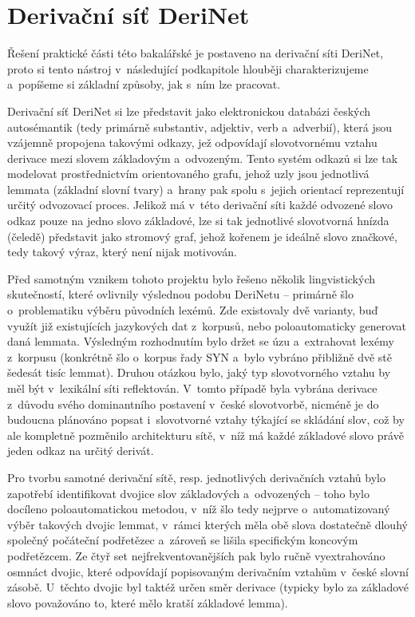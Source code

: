 \hypertarget{derivaux10dnuxed-suxedux165-derinet}{%
\section{Derivační síť
DeriNet}\label{derivaux10dnuxed-suxedux165-derinet}}

Řešení praktické části této bakalářské je postaveno na derivační síti
DeriNet, proto si tento nástroj v~následující podkapitole hlouběji
charakterizujeme a~popíšeme si základní způsoby, jak s~ním lze pracovat.

Derivační síť DeriNet si lze představit jako elektronickou databázi
českých autosémantik (tedy primárně substantiv, adjektiv, verb
a~adverbií), která jsou vzájemně propojena takovými odkazy, jež odpovídají
slovotvornému vztahu derivace mezi slovem základovým a~odvozeným. Tento
systém odkazů si lze tak modelovat prostřednictvím orientovaného grafu,
jehož uzly jsou jednotlivá lemmata (základní slovní tvary) a~hrany pak
spolu s~jejich orientací reprezentují určitý odvozovací proces. Jelikož
má v~této derivační síti každé odvozené slovo odkaz pouze na jedno slovo
základové, lze si tak jednotlivé slovotvorná hnízda (čeledě) představit
jako stromový graf, jehož kořenem je ideálně slovo značkové, tedy takový
výraz, který není nijak motivován.~\parencite{derinet-cz}

Před samotným vznikem tohoto projektu bylo řešeno několik lingvistických
skutečností, které ovlivnily výslednou podobu DeriNetu -- primárně šlo
o~problematiku výběru původních lexémů. Zde existovaly dvě varianty, buď
využít již existujících jazykových dat z~korpusů, nebo poloautomaticky
generovat daná lemmata. Výsledným rozhodnutím bylo držet se úzu
a~extrahovat lexémy z~korpusu (konkrétně šlo o~korpus řady SYN a~bylo
vybráno přibližně dvě stě šedesát tisíc lemmat). Druhou otázkou bylo,
jaký typ slovotvorného vztahu by měl být v~lexikální síti reflektován.
V~tomto případě byla vybrána derivace z~důvodu svého dominantního
postavení v~české slovotvorbě, nicméně je do budoucna plánováno popsat
i~slovotvorné vztahy týkající se skládání slov, což by ale kompletně
pozměnilo architekturu sítě, v~níž má každé základové slovo právě jeden
odkaz na určitý derivát.~\parencite{sevcikova14}

Pro tvorbu samotné derivační sítě, resp. jednotlivých derivačních vztahů
bylo zapotřebí identifikovat dvojice slov základových a~odvozených --
toho bylo docíleno poloautomatickou metodou, v~níž šlo tedy nejprve
o~automatizovaný výběr takových dvojic lemmat, v~rámci kterých měla obě
slova dostatečně dlouhý společný počáteční podřetězec a~zároveň se
lišila specifickým koncovým podřetězcem. Ze čtyř set
nejfrekventovanějších pak bylo ručně vyextrahováno osmnáct dvojic, které
odpovídají popisovaným derivačním vztahům v~české slovní zásobě.
U~těchto dvojic byl taktéž určen směr derivace (typicky bylo za základové
slovo považováno to, které mělo kratší základové lemma).
\parencite{derinet-cz}

